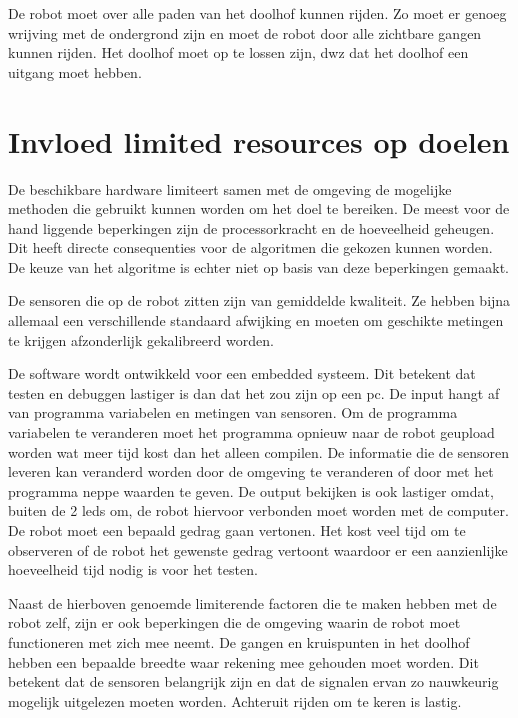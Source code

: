 \documentclass{article}
\begin{document}
De robot moet over alle paden van het doolhof kunnen rijden. Zo moet er genoeg wrijving
met de ondergrond zijn en moet de robot door alle zichtbare gangen kunnen rijden.
Het doolhof moet op te lossen zijn, dwz dat het doolhof een uitgang moet hebben.

\newpage
\section{Invloed limited resources op doelen}
De beschikbare hardware limiteert samen met de omgeving de mogelijke methoden die
gebruikt kunnen worden om het doel te bereiken.
De meest voor de hand liggende beperkingen zijn de processorkracht en de hoeveelheid
geheugen. Dit heeft directe consequenties voor de algoritmen die gekozen kunnen worden. De keuze van het algoritme is echter niet op basis van deze beperkingen gemaakt. 

De sensoren die op de robot zitten zijn van gemiddelde kwaliteit. Ze hebben bijna allemaal
een verschillende standaard afwijking en moeten om geschikte metingen te krijgen
afzonderlijk gekalibreerd worden.

De software wordt ontwikkeld voor een embedded systeem. Dit betekent dat testen en
debuggen lastiger is dan dat het zou zijn op een pc. De input hangt af van programma
variabelen en metingen van sensoren. Om de programma variabelen te veranderen moet het
programma opnieuw naar de robot geupload worden wat meer tijd kost dan het alleen
compilen. De informatie die de sensoren leveren kan veranderd worden door de omgeving
te veranderen of door met het programma neppe waarden te geven. De output bekijken is
ook lastiger omdat, buiten de 2 leds om, de robot hiervoor verbonden moet worden met de
computer. De robot moet een bepaald gedrag gaan vertonen. Het kost veel tijd om te
observeren of de robot het gewenste gedrag vertoont waardoor er een aanzienlijke
hoeveelheid tijd nodig is voor het testen.

Naast de hierboven genoemde limiterende factoren die te maken hebben met de robot zelf,
zijn er ook beperkingen die de omgeving waarin de robot moet functioneren met zich mee
neemt. De gangen en kruispunten in het doolhof hebben een bepaalde breedte waar
rekening mee gehouden moet worden. Dit betekent dat de sensoren belangrijk zijn en dat de
signalen ervan zo nauwkeurig mogelijk uitgelezen moeten worden. Achteruit rijden om te
keren is lastig.
\end{document}
